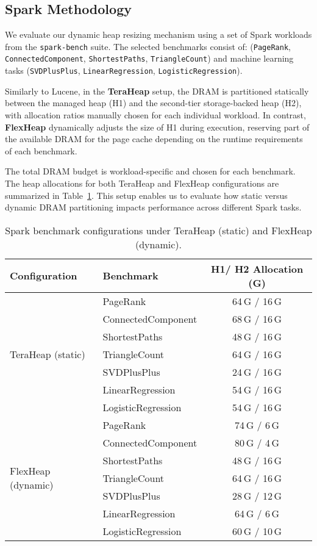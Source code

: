 \subsection{Spark Methodology}
\label{sec:spark-methodology}

We evaluate our dynamic heap resizing mechanism using a set of Spark workloads 
from the \texttt{spark-bench} suite. The selected benchmarks consist of:
(\texttt{PageRank}, \texttt{ConnectedComponent}, \texttt{ShortestPaths}, \texttt{TriangleCount}) 
and machine learning tasks (\texttt{SVDPlusPlus}, \texttt{LinearRegression}, \texttt{LogisticRegression}).

Similarly to Lucene, in the \textbf{TeraHeap} setup, the DRAM is partitioned statically between the managed heap (H1) and the second-tier 
storage-backed heap (H2), with allocation ratios manually chosen for each individual workload. In contrast, \textbf{FlexHeap} 
dynamically adjusts the size of H1 during execution, reserving part of the available DRAM for the page cache depending on
the runtime requirements of each benchmark. 

The total DRAM budget is workload-specific and chosen for each benchmark.
The heap allocations for both TeraHeap and FlexHeap configurations are summarized in Table~\ref{tab:spark-benchmark-configs}.
This setup enables us to evaluate how static versus dynamic DRAM partitioning impacts performance across different Spark tasks.


\begin{table}[H]
\centering
\small
\renewcommand{\arraystretch}{1}
\caption{Spark benchmark configurations under TeraHeap (static) and FlexHeap (dynamic).}
\label{tab:spark-benchmark-configs}
\begin{tabular}{|l|l|c|}
\hline
\textbf{Configuration} & \textbf{Benchmark} & \textbf{H1/ H2 Allocation (G)} \\
\hline
\multirow{7}{*}{TeraHeap (static)} 
& PageRank             & 64\,G / 16\,G \\
& ConnectedComponent   & 68\,G / 16\,G \\
& ShortestPaths        & 48\,G / 16\,G \\
& TriangleCount        & 64\,G / 16\,G \\
& SVDPlusPlus          & 24\,G / 16\,G \\
& LinearRegression     & 54\,G / 16\,G \\
& LogisticRegression   & 54\,G / 16\,G \\
\hline
\multirow{7}{*}{FlexHeap (dynamic)} 
& PageRank             & 74\,G / 6\,G  \\
& ConnectedComponent   & 80\,G / 4\,G  \\
& ShortestPaths        & 48\,G / 16\,G \\
& TriangleCount        & 64\,G / 16\,G \\
& SVDPlusPlus          & 28\,G / 12\,G \\
& LinearRegression     & 64\,G / 6\,G  \\
& LogisticRegression   & 60\,G / 10\,G \\
\hline
\end{tabular}
\end{table}

